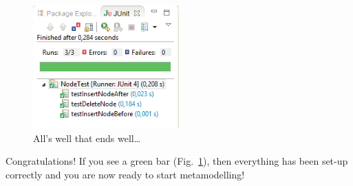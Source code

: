 \begin{enumerate}
\begin{figure}[htbp]
	\centering
  \includegraphics[width=0.5\textwidth]{../installation_images/eclipse_testsuiterun.png}
	\caption{All's well that ends well\ldots}
	\label{fig_eclipsetestsuiterun}
\end{figure}
\end{enumerate}

Congratulations!  If you see a green bar  (Fig.~\ref{fig_eclipsetestsuiterun}), then everything has been set-up correctly and you are now ready to start metamodelling!


